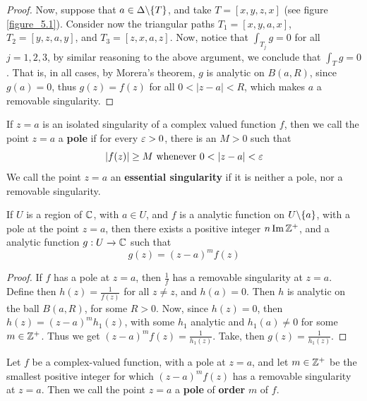 \begin{proof}
    Now, suppose that $a \in \Delta \backslash \{T\}$, and take $T=[x,y,z,x]$ (see
    figure \ref{figure_5.1}). Consider now the triangular paths $T_1=[x,y,a,x]$,
    $T_2=[y,z,a,y]$, and $T_3=[z,x,a,z]$. Now, notice that $\int_{T_j}{g}=0$ for
    all $j=1,2,3$, by similar reasoning to the above argument, we conclude that
     $\int_T{g}=0$. That is, in all cases, by Morera's theorem, $g$ is
     analytic on  $B(a,R)$, since $g(a)=0$, thus $g(z)=f(z)$ for all
     $0<|z-a|<R$, which makes  $a$ a removable singularity.
\end{proof}

\begin{definition}
    If $z=a$ is an isolated singularity of a complex valued function $f$, then
    we call the point $z=a$ a  \textbf{pole} if for every $\varepsilon>0$, there is an
    $M>0$ such that
    \begin{equation*}
        |f(z)| \geq M \text{ whenever } 0<|z-a|<\e
    \end{equation*}
    We call the point $z=a$ an \textbf{essential singularity} if it is neither a
    pole, nor a removable singularity.
\end{definition}

\begin{lemma}\label{5.1.2}
    If $U$ is a region of  $\mathbb{C}$, with  $a \in U$, and  $f$ is a analytic
    function on  $U \backslash \{a\}$, with a pole at the point $z=a$, then there
    exists a positive integer  $n \operatorname{Im} \mathbb{Z}^+$, and a analytic function  $g:U
    \xrightarrow{} \mathbb{C}$ such that
    \begin{equation*}
        g(z)=(z-a)^mf(z)
    \end{equation*}
\end{lemma}
\begin{proof}
    If $f$ has a pole at  $z=a$, then  $\frac{1}{f}$ has a removable singularity
    at $z=a$. Define then  $h(z)=\frac{1}{f(z)}$ for all $z \neq z$, and
    $h(a)=0$. Then $h$ is analytic on the ball  $B(a,R)$, for some $R>0$.
    Now, since  $h(z)=0$, then $h(z)=(z-a)^mh_1(z)$, with some $h_1$ analytic
    and $h_1(a) \neq 0$ for some $m \in \mathbb{Z}^+$. Thus we get
    $(z-a)^mf(z)=\frac{1}{h_1(z)}$. Take, then $g(z)=\frac{1}{h_1(z)}$.
\end{proof}

\begin{definition}
    Let $f$ be a complex-valued function, with a pole at  $z=a$, and let  $m \in
    \mathbb{Z}^+$ be the smallest positive integer for which  $(z-a)^mf(z)$ has a
    removable singularity at $z=a$. Then we call the point $z=a$ a
    \textbf{pole} of \textbf{order} $m$ of  $f$.
\end{definition}

